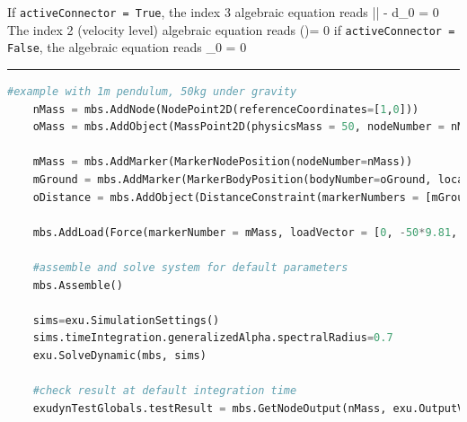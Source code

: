     If \texttt{activeConnector = True}, the index 3 algebraic equation reads
    \be
      \left|\right| - d_0 = 0
    \ee
    The index 2 (velocity level) algebraic equation reads
    \be
      \left(\right)\tp \Delta\vv = 0
    \ee
    if \texttt{activeConnector = False}, the algebraic equation reads
    \be
      \lambda_0 = 0
    \ee
\vspace{6pt}\par\noindent\rule{\textwidth}{0.4pt}
\label{miniExample_ObjectConnectorDistance}
\pythonstyle
\begin{lstlisting}[language=Python, firstnumber=1]
    #example with 1m pendulum, 50kg under gravity
    nMass = mbs.AddNode(NodePoint2D(referenceCoordinates=[1,0]))
    oMass = mbs.AddObject(MassPoint2D(physicsMass = 50, nodeNumber = nMass))
    
    mMass = mbs.AddMarker(MarkerNodePosition(nodeNumber=nMass))
    mGround = mbs.AddMarker(MarkerBodyPosition(bodyNumber=oGround, localPosition = [0,0,0]))
    oDistance = mbs.AddObject(DistanceConstraint(markerNumbers = [mGround, mMass], distance = 1))
    
    mbs.AddLoad(Force(markerNumber = mMass, loadVector = [0, -50*9.81, 0])) 

    #assemble and solve system for default parameters
    mbs.Assemble()
    
    sims=exu.SimulationSettings()
    sims.timeIntegration.generalizedAlpha.spectralRadius=0.7
    exu.SolveDynamic(mbs, sims)

    #check result at default integration time
    exudynTestGlobals.testResult = mbs.GetNodeOutput(nMass, exu.OutputVariableType.Position)[0]
\end{lstlisting}

